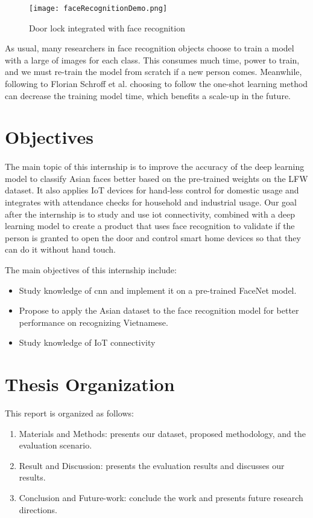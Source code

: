 \begin{figure}[H]
    \centering
    \texttt{[image: faceRecognitionDemo.png]}
    \caption{Door lock integrated with face recognition}
    \label{fig:faceregDoorLock}
\end{figure}

As usual, many researchers in face recognition objects choose to train a model with a large of images for each class. This consumes much time, power to train, and we must re-train the model from scratch if a new person comes. Meanwhile, following to Florian Schroff et al.\cite{DBLP:journals/corr/SchroffKP15} choosing to follow the one-shot learning method can decrease the training model time, which benefits a scale-up in the future. 
\clearpage
\section{Objectives}
\paragraph{}
The main topic of this internship is to improve the accuracy of the deep learning model to classify Asian faces better based on the pre-trained weights on the LFW dataset. It also applies IoT devices for hand-less control for domestic usage and integrates with attendance checks for household and industrial usage. Our goal after the internship is to study and use \acrshort{iot} connectivity, combined with a deep learning model to create a product that uses face recognition to validate if the person is granted to open the door and control smart home devices so that they can do it without hand touch.

The main objectives of this internship include:

\begin{itemize}
    \item Study knowledge of \acrlong{cnn} and implement it on a pre-trained FaceNet\cite{DBLP:journals/corr/SchroffKP15} model.
    \item Propose to apply the Asian dataset to the face recognition model for better performance on recognizing Vietnamese.
    \item Study knowledge of IoT connectivity
\end{itemize}

\section{Thesis Organization}
This report is organized as follows:
\begin{enumerate}
	\item Materials and Methods: presents our dataset, proposed methodology, and the evaluation scenario.
	\item Result and Discussion: presents the evaluation results and discusses our results.
	\item Conclusion and Future-work: conclude the work and presents future research directions.
\end{enumerate}
